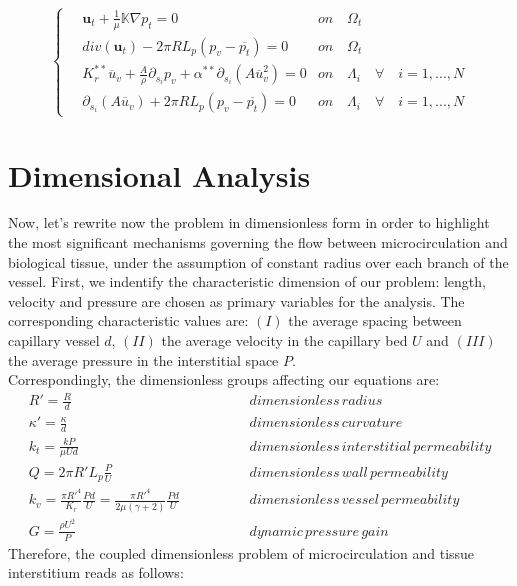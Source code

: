 \documentclass[a4paper]{report}
\begin{document}
\begin{equation}
\begin{cases}
\quad \mathbf{u}_t+\frac{1}{\mu}\mathbb{K}\nabla p_t=0 & on \quad \Omega_t\\
\quad div(\mathbf{u}_t)-2 \pi R L_p (p_v-\overline{p_t})=0 & on \quad \Omega_t\\
\quad K_r^{**} \overline{u}_v+ \frac{A}{\rho}\partial_{s_i} p_v + \alpha^{**}\partial_{s_i} (A\overline{u}_v^2)=0 & on \quad \Lambda_i \quad \forall \quad i=1,...,N\\
\quad \partial_{s_i} ( A \overline{u}_v) + 2 \pi R L_p (p_v - \overline{p_t})=0& on \quad \Lambda_i \quad \forall \quad i=1,...,N
\end{cases}
\end{equation}


\section{Dimensional Analysis}
Now, let's rewrite now the problem in dimensionless form in order to highlight the most significant mechanisms governing the flow between microcirculation and biological tissue, under the assumption of constant radius over each branch of the vessel. First, we indentify the characteristic dimension of our problem: length, velocity and pressure are chosen as primary variables for the analysis. The corresponding characteristic values are: $(I)$ the average spacing between capillary vessel $d$, $(II)$ the average velocity in the capillary bed $U$ and $(III)$ the average pressure in the interstitial space $P$.\\
Correspondingly, the dimensionless groups affecting our equations are:
\begin{align*}
R'=\frac{R}{d} \quad \quad \quad\quad \quad \quad \quad \quad \quad& dimensionless \, radius\\
\kappa'=\frac{\kappa}{d}\quad \quad \quad\quad \quad \quad \quad \quad \quad& dimensionless\, curvature\\
k_t = \frac{kP}{\mu U d} \quad \quad \quad\quad \quad \quad\quad \quad \quad& dimensionless \, interstitial \, permeability\\
Q = 2 \pi R' L_p \frac{P}{U}\quad \quad \quad\quad \quad \quad \quad \quad \quad& dimensionless\, wall\, permeability \\
k_v= \frac{\pi{ R'}^4}{K_r} \frac{Pd}{U} =\frac{\pi{ R'}^4}{2 \mu (\gamma + 2)} \frac{Pd}{U}\quad  & dimensionless\, vessel\, permeability\\
G= \frac{\rho U^2}{P}\quad \quad \quad\quad \quad \quad \quad \quad \quad& dynamic \, pressure \, gain
\end{align*}
Therefore, the coupled dimensionless problem of microcirculation and tissue interstitium reads as follows:
\end{document}
